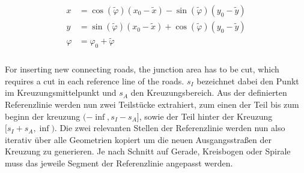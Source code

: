 \documentclass[a4paper, 10pt, conference]{ieeeconf}      %
\begin{document}
    \begin{align} \label{eq2}
        \begin{split}
            x &= \cos(\tilde{\varphi}) \left(x_0-\tilde{x}\right) - \sin(\tilde{\varphi}) \left(y_0-\tilde{y}\right) \\
            y &= \sin(\tilde{\varphi}) \left(x_0-\tilde{x}\right) + \cos(\tilde{\varphi}) \left(y_0-\tilde{y}\right) \\
            \varphi &= \varphi_0 + \tilde{\varphi} \\
        \end{split}
    \end{align}

    For inserting new connecting roads, the junction area has to be cut, which requires a cut in each reference line of the roads. \(s_I\) bezeichnet dabei den Punkt im Kreuzungsmittelpunkt und \(s_A\) den Kreuzungsbereich. Aus der definierten Referenzlinie werden nun zwei Teilstücke extrahiert, zum einen der Teil bis zum beginn der kreuzung \((-\inf,s_I - s_A]\), sowie der Teil hinter der Kreuzung \([s_I + s_A, \inf)\). Die zwei relevanten Stellen der Referenzlinie werden nun also iterativ über alle Geometrien kopiert um die neuen Ausgangsstraßen der Kreuzung zu generieren. Je nach Schnitt auf Gerade, Kreisbogen oder Spirale muss das jeweile Segment der Referenzlinie angepasst werden.
    

\end{document}
